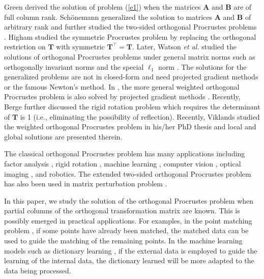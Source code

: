 \documentclass[titlepage,11pt,twoside]{article}
\begin{document}
Green \cite{green1952orthogonal} derived the solution of problem (\ref{e1}) when the matrices $\mathbf{A}$ and $\mathbf{B}$ are of full column rank. Sch{\"o}nemann \cite{schonemann1966generalized} generalized the solution to matrices $\mathbf{A}$ and $\mathbf{B}$ of arbitrary rank and further studied the two-sided orthogonal Procrustes problems \cite{schonemann1968two}. Higham \cite{higham1988symmetric} studied the symmetric Procrustes problem by replacing the orthogonal restriction on $\mathbf{T}$ with symmetric $\mathbf{T}^{\top}=\mathbf{T}$. Later, Watson \emph{et al.} studied the solutions of orthogonal Procrustes problems under general matrix norms such as orthogonally invariant norms \cite{Watson1994} and the special $\ell_{1}$ norm \cite{trendafilov2004l1}. The solutions for the generalized problems are not in closed-form and need projected gradient methods \cite{chu1990projected} or the famous Newton's method. In \cite{trendafilov2004l1}, the more general weighted orthogonal Procrustes problem is also solved by projected gradient methods \cite{chu1990projected}. Recently, Berge \cite{Berge2006} further discussed the rigid rotation problem which requires the determinant of $\mathbf{T}$ is 1 (i.e., eliminating the possibility of reflection). Recently, Viklands studied the weighted orthogonal Procrustes problem in his/her PhD thesis and local and global solutions are presented therein.  

The classical orthogonal Procrustes problem \cite{procrustesprogram} has many applications including factor analysis \cite{green1952orthogonal}, rigid rotation \cite{Berge2006}, machine learning \cite{zou2006sparse}, computer vision \cite{zhang2000flexible,pointpatterns}, optical imaging , and robotics. The extended two-sided orthogonal Procrustes problem has also been used in matrix perturbation problem \cite{schonemann1968two}. 

In this paper, we study the solution of the orthogonal Procrustes problem when partial columns of the orthogonal transformation matrix are known. This is possibly emerged in practical applications. For examples, in the point matching problem \cite{pointpatterns}, if some points have already been matched, the matched data can be used to guide the matching of the remaining points. In the machine learning models such as dictionary learning \cite{aharon2006img}, if the external data is employed to guide the learning of the internal data, the dictionary learned will be more adapted to the data being processed.
\end{document}
